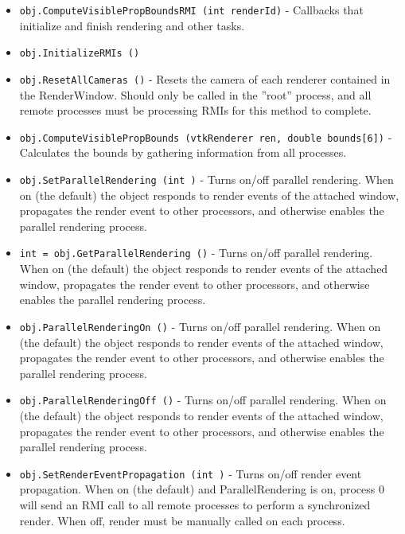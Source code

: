 \begin{itemize}
\item  \verb|obj.ComputeVisiblePropBoundsRMI (int renderId)| -  Callbacks that initialize and finish rendering and other tasks.

\item  \verb|obj.InitializeRMIs ()|

\item  \verb|obj.ResetAllCameras ()| -  Resets the camera of each renderer contained in the RenderWindow.
 Should only be called in the ''root'' process, and all remote processes
 must be processing RMIs for this method to complete.

\item  \verb|obj.ComputeVisiblePropBounds (vtkRenderer ren, double bounds[6])| -  Calculates the bounds by gathering information from all processes.

\item  \verb|obj.SetParallelRendering (int )| -  Turns on/off parallel rendering.  When on (the default) the object
 responds to render events of the attached window, propagates the
 render event to other processors, and otherwise enables the parallel
 rendering process.

\item  \verb|int = obj.GetParallelRendering ()| -  Turns on/off parallel rendering.  When on (the default) the object
 responds to render events of the attached window, propagates the
 render event to other processors, and otherwise enables the parallel
 rendering process.

\item  \verb|obj.ParallelRenderingOn ()| -  Turns on/off parallel rendering.  When on (the default) the object
 responds to render events of the attached window, propagates the
 render event to other processors, and otherwise enables the parallel
 rendering process.

\item  \verb|obj.ParallelRenderingOff ()| -  Turns on/off parallel rendering.  When on (the default) the object
 responds to render events of the attached window, propagates the
 render event to other processors, and otherwise enables the parallel
 rendering process.

\item  \verb|obj.SetRenderEventPropagation (int )| -  Turns on/off render event propagation.  When on (the default) and
 ParallelRendering is on, process 0 will send an RMI call to all remote
 processes to perform a synchronized render.  When off, render must be
 manually called on each process.


\end{itemize}
